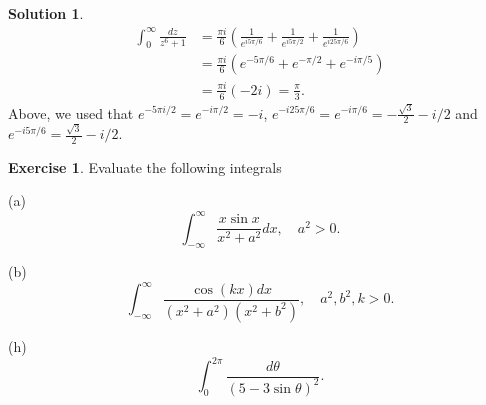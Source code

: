 \documentclass[12pt]{article}
\theoremstyle{definition}
\newtheorem{exer}{Exercise}
\newtheorem{sol}{Solution}
\theoremstyle{remark}
\begin{document}
\begin{sol}
\begin{align}
    \int_{0}^\infty \frac{dz}{z^6+1} &= \frac{\pi i}{6} \left( \frac{1}{e^{i5\pi/6}} +  \frac{1}{e^{i5\pi/2}} +  \frac{1}{e^{i25\pi/6}} \right)\\
                                     &=  \frac{\pi i}{6}\left(e^{-5\pi/6} + e^{-\pi/2} + e^{-i\pi/5}  \right)\\ 
                                     &= \frac{\pi i}{6} \left(-2i \right) =  \frac{\pi}{3}. 
\end{align}
Above, we used that $e^{-5\pi i /2} = e^{-i\pi/2} = -i$, $e^{-i 25\pi / 6} = e^{-i\pi/6} = -\frac{\sqrt{3}}{2} - i/2$ and $e^{-i5\pi/6} =\frac{\sqrt{3}}{2} - i/2$.
\end{sol}

\newpage

\begin{exer}
    Evaluate the following integrals

    (a) \begin{equation*}
        \int_{-\infty}^{\infty} \frac{x\sin x}{x^2+a^2}dx, \quad a^2 > 0. 
    \end{equation*}

    (b) \begin{equation*}
            \int_{-\infty}^{\infty} \frac{\cos(kx)dx}{(x^2+a^2)(x^2+b^2)}, \quad a^2, b^2, k > 0. 
        \end{equation*}

    (h) \begin{equation*}
        \int_0^{2\pi} \frac{d\theta}{(5-3\sin\theta)^2}. 
    \end{equation*}
\end{exer}
\end{document}
